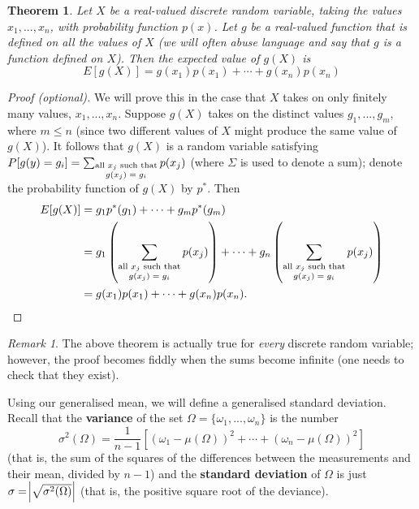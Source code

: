 \documentclass[a4paper,leqno]{article}
\numberwithin{equation}{section}
\newtheorem{thm}[equation]{Theorem}
\theoremstyle{definition}
\theoremstyle{remark}
\newtheorem{rem}[equation]{Remark}
\newcommand{\df}{\textbf}
\begin{document}
\begin{thm}\label{thm:meanoffunc}
  Let $ X $ be a real-valued discrete random variable, taking the values $ x_1,...,x_n $, with probability function $ p(x) $.
  Let $ g $ be a real-valued function that is defined on all the values of $ X $ (we will often abuse language and say that $ g $
  is a function defined on $ X $). Then the expected value of $ g(X) $ is
  \begin{displaymath}
    E[g(X)] = g(x_1) p(x_1) + \cdots + g(x_n) p(x_n)
  \end{displaymath}
\end{thm}
\begin{proof}[Proof (optional)]
  We will prove this in the case that $ X $ takes on only finitely many values, $ x_1,...,x_n $. Suppose $ g(X) $ takes on the distinct
  values $ g_1,...,g_m $, where $ m \leq n $ (since two different values of $ X $ might produce the same value of $ g(X) $). It
  follows that $ g(X) $ is a random variable satisfying $ P[g(y) = g_i] = \sum_{\substack{\text{all $ x_j $ such that}\\\text{$g(x_j) = g_i$}}} p(x_j) $ (where $ \Sigma $ is
  used to denote a sum);   denote the probability function of $ g(X) $ by $ p^* $. Then
  \begin{align*}
    E[g(X)] &= g_1 p^*(g_1) + \cdots + g_m p^*(g_m)\\
            &= g_1 \left(\sum_{\substack{\text{all $ x_j $ such that}\\\text{$g(x_j) = g_i$}}} p(x_j)\right) + \cdots + g_n \left(\sum_{\substack{\text{all $ x_j $ such that}\\\text{$g(x_j) = g_i$}}} p(x_j)\right)\\
            &= g(x_1) p(x_1) + \cdots + g(x_n) p(x_n).
  \end{align*}
\end{proof}

\begin{rem}
  The above theorem is actually true for \emph{every} discrete random variable; however, the proof becomes fiddly when the sums become
  infinite (one needs to check that they exist).
\end{rem}

Using our generalised mean, we will define a generalised standard deviation. Recall that the \df{variance} of
the set $ \Omega = \{\omega_1,...,\omega_n\} $ is the number
\begin{displaymath}
  \sigma^2(\Omega) = \frac{1}{n - 1}\left[(\omega_1 - \mu(\Omega))^2 + \cdots + (\omega_n - \mu(\Omega))^2\right]
\end{displaymath}
(that is, the sum of the squares of the differences between the measurements and their mean, divided by $ n - 1 $)
and the \df{standard deviation} of $ \Omega $ is just $ \sigma = \abs{\sqrt{\sigma^2(\Omega)}} $ (that is, the positive
square root of the deviance).
\end{document}
